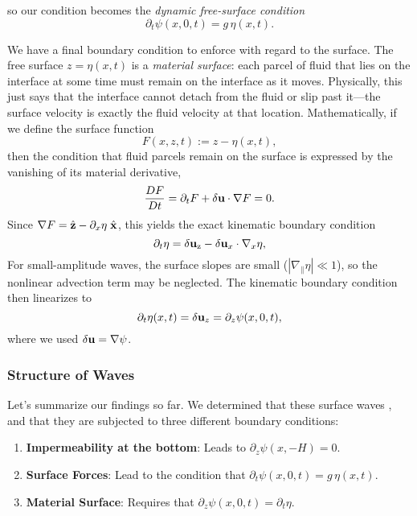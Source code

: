 so our condition becomes the \emph{dynamic free-surface condition}
\begin{equation}
\partial_t \psi(x,0,t) = g\,\eta(x,t).
\label{eq:dynBC}
\end{equation}
\par
We have a final boundary condition to enforce with regard to the surface. The free surface $z=\eta(x,t)$ is a \emph{material surface}: each parcel of fluid that lies on the interface at some time must remain on the interface as it moves. Physically, this just says that the interface cannot detach from the fluid or slip past it—the surface velocity is exactly the fluid velocity at that location. 
Mathematically, if we define the surface function 
\[
F(x,z,t) := z - \eta(x,t),
\]
then the condition that fluid parcels remain on the surface is expressed by the vanishing of its material derivative, 
\[
\frac{DF}{Dt} = \partial_t F + \delta{\bf u}\cdot\nabla F = 0.
\]
Since $\nabla F = \hat{\bf z} - \partial_x\eta\; \hat{\bf x}$, this yields the exact kinematic boundary condition
\begin{equation}
\partial_t \eta = \delta{\bf u}_{\rm z} - \delta{\bf u}_x \cdot \nabla_x \eta,
\end{equation}
For small-amplitude waves, the surface slopes are small ($|\nabla_\parallel \eta|\ll 1$), so the nonlinear advection term may be neglected. The kinematic boundary condition then linearizes to
\begin{equation}
\partial_t \eta(x,t) = \delta {\bf u}_z= \partial_z \psi(x,0,t),
\label{eq:kinBC}
\end{equation}
where we used $\delta{\bf u} = \nabla\psi$. 

\subsubsection*{Structure of Waves}
Let's summarize our findings so far. We determined that these surface waves , and that they are subjected to three different boundary conditions:
\begin{enumerate}
    \item \textbf{Impermeability at the bottom}: Leads to $\partial_z \psi(x,-H) = 0$.
    \item \textbf{Surface Forces}: Lead to the condition that $\partial_t \psi(x,0,t) = g\,\eta(x,t).$
    \item \textbf{Material Surface}: Requires that $\partial_z \psi(x,0,t) = \partial_t\eta$.
\end{enumerate}

